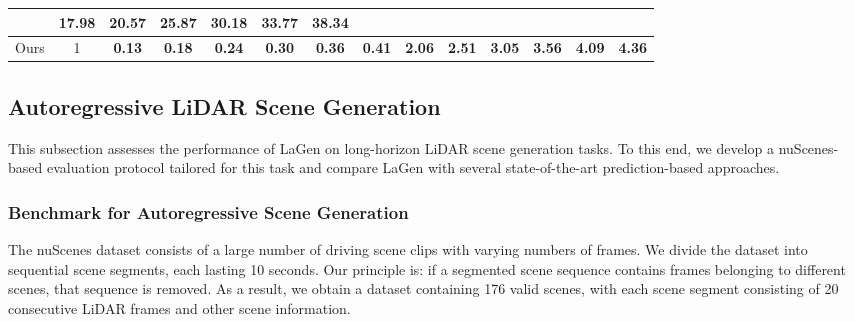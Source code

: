 \begin{table}[ht]
\begin{tabular}{cccccccc|cccccc}
& 17.98 & 20.57 & 25.87 & 30.18 & \cellcolor{Lavender}  33.77 & \cellcolor{Lavender}  38.34 \\
\midrule
Ours & 
\cellcolor{rowgray}1
& \cellcolor{LightPink} \textbf{0.13} & \cellcolor{LightPink} \textbf{0.18} & \cellcolor{LightPink} \textbf{0.24} & \cellcolor{LightPink} \textbf{0.30} & \cellcolor{LightPink} \textbf{0.36} & \cellcolor{LightPink} \textbf{0.41}  & \cellcolor{LightPink} \textbf{2.06} & \cellcolor{LightPink} \textbf{2.51} &  \cellcolor{LightPink} \textbf{3.05} & \cellcolor{LightPink} \textbf{3.56} & \cellcolor{LightPink} \textbf{4.09} & \cellcolor{LightPink} \textbf{4.36}\\
\bottomrule
\end{tabular}
\label{table_metric2}
\vspace{-3mm}
\end{table}

\subsection{Autoregressive LiDAR Scene Generation}
This subsection assesses the performance of LaGen on long-horizon LiDAR scene generation tasks. 
To this end, we develop a nuScenes-based evaluation protocol tailored for this task and compare LaGen with several state-of-the-art prediction-based approaches.

\subsubsection{Benchmark for Autoregressive Scene Generation}
The nuScenes dataset consists of a large number of driving scene clips with varying numbers of frames. 
We divide the dataset into sequential scene segments, each lasting 10 seconds.
Our principle is: if a segmented scene sequence contains frames belonging to different scenes, that sequence is removed.
As a result, we obtain a dataset containing 176 valid scenes, with each scene segment consisting of 20 consecutive LiDAR frames and other scene information.

